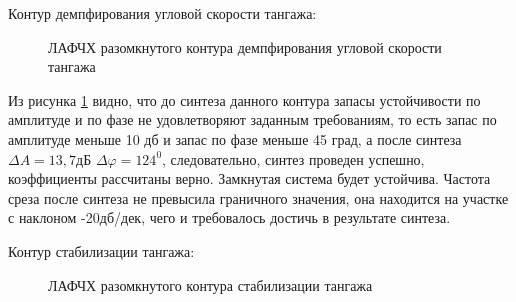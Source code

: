 \begin{center}
    Контур демпфирования угловой скорости тангажа:
\end{center}

\begin{figure}[H]
    \caption{ЛАФЧХ разомкнутого контура демпфирования угловой скорости тангажа}
    \label{fig:Угловая скорость тангажа раз qMAX}
\end{figure}

Из рисунка \ref{fig:Угловая скорость тангажа раз qMAX} видно, что до синтеза данного контура запасы устойчивости по амплитуде и по фазе не удовлетворяют заданным требованиям, то есть запас по амплитуде меньше 10 дб и запас по фазе меньше 45 град, а после синтеза $\Delta A = 13,7 $дБ $\Delta \varphi = 124^0$, следовательно, синтез проведен успешно, коэффициенты рассчитаны верно. Замкнутая система будет устойчива. Частота среза после синтеза не превысила граничного значения, она находится на участке с наклоном -20дб/дек, чего и требовалось достичь в результате синтеза.  

\begin{center}
    Контур стабилизации тангажа:
\end{center}

\begin{figure}[H]
    \caption{ЛАФЧХ разомкнутого контура стабилизации тангажа}
    \label{fig:Тангаж раз qMAX}
\end{figure}

